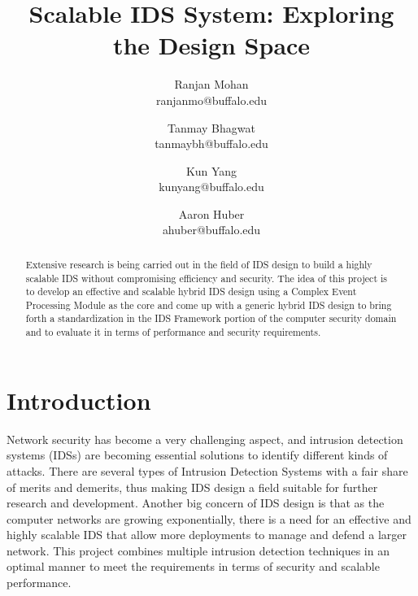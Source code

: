 \documentclass[conference]{sig-alternate-05-2015}
\begin{document}
\title{Scalable IDS System: Exploring the Design Space}


\author{Ranjan Mohan\\ ranjanmo@buffalo.edu \and Tanmay Bhagwat\\ tanmaybh@buffalo.edu \and Kun Yang\\ kunyang@buffalo.edu \and Aaron Huber\\ ahuber@buffalo.edu}

\maketitle



\begin{abstract}
Extensive research is being carried out in the field of IDS design to build a highly scalable IDS without compromising efficiency and security. The idea of this project is to develop an effective and scalable hybrid IDS design using a Complex Event Processing Module as the core and come up with a generic hybrid IDS design to bring forth a standardization in the IDS Framework portion of the computer security domain and to evaluate it in terms of performance and security requirements.
\end{abstract}

\section{Introduction}\label{sec:introduction}
Network security has become a very challenging aspect, and intrusion detection systems (IDSs) are becoming essential solutions to identify different kinds of attacks. There are several types of Intrusion Detection Systems with a fair share of merits and demerits, thus making IDS design a field suitable for further research and development. Another big concern of IDS design is that as the computer networks are growing exponentially, there is a need for an effective and highly scalable IDS that allow more deployments to manage and defend a larger network. This project combines multiple intrusion detection techniques in an optimal manner to meet the requirements in terms of security and scalable performance.
\end{document}
